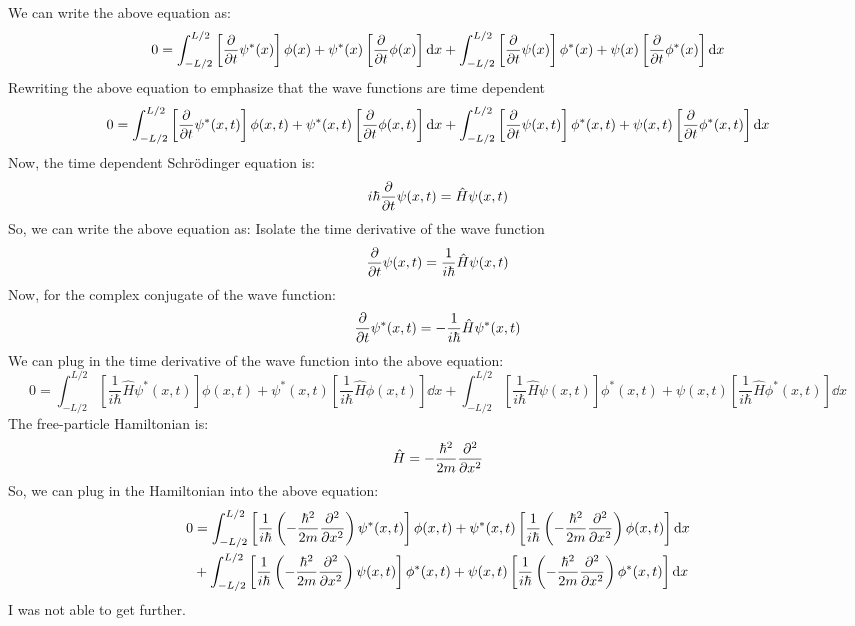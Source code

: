\documentclass[12pt]{article}
\begin{document}
We can write the above equation as:
\begin{equation}
  0=\int_{-L / 2}^{L / 2} \left[\pdv{t}\psi^*(x)\right]\phi(x)+\psi^*(x)\left[\pdv{t}\phi(x)\right]\dd{x}+\int_{-L / 2}^{L / 2} \left[\pdv{t}\psi(x)\right]\phi^*(x)+\psi(x)\left[\pdv{t}\phi^*(x)\right] \dd{x}
\end{equation}
Rewriting the above equation to emphasize that the wave functions are time dependent
\begin{equation}
  0=\int_{-L / 2}^{L / 2} \left[\pdv{t}\psi^*(x,t)\right]\phi(x,t)+\psi^*(x,t)\left[\pdv{t}\phi(x,t)\right]\dd{x}+\int_{-L / 2}^{L / 2} \left[\pdv{t}\psi(x,t)\right]\phi^*(x,t)+\psi(x,t)\left[\pdv{t}\phi^*(x,t)\right] \dd{x}
\end{equation}
Now, the time dependent Schrödinger equation is:
\begin{equation}
  i\hbar\pdv{t}\psi(x,t)=\hat{H}\psi(x,t)
\end{equation}
So, we can write the above equation as:
Isolate the time derivative of the wave function
\begin{equation}
  \pdv{t}\psi(x,t)=\frac{1}{i\hbar}\hat{H}\psi(x,t)
\end{equation}
Now, for the complex conjugate of the wave function:
\begin{equation}
  \pdv{t}\psi^*(x,t)=-\frac{1}{i\hbar}\hat{H}\psi^*(x,t)
\end{equation}
We can plug in the time derivative of the wave function into the above equation:
\begin{equation}
  0=\int_{-L / 2}^{L / 2} \left[\frac{1}{i\hbar}\hat{H}\psi^*(x,t)\right]\phi(x,t)+\psi^*(x,t)\left[\frac{1}{i\hbar}\hat{H}\phi(x,t)\right]\dd{x}+\int_{-L / 2}^{L / 2} \left[\frac{1}{i\hbar}\hat{H}\psi(x,t)\right]\phi^*(x,t)+\psi(x,t)\left[\frac{1}{i\hbar}\hat{H}\phi^*(x,t)\right] \dd{x}
\end{equation}
The free-particle Hamiltonian is:
\begin{equation}
  \hat{H}=-\frac{\hbar^2}{2m}\pdv[2]{x}
\end{equation}
So, we can plug in the Hamiltonian into the above equation:
\begin{equation}
  \begin{aligned}
    0&=\int_{-L / 2}^{L / 2} \left[\frac{1}{i\hbar}\left(-\frac{\hbar^2}{2m}\pdv[2]{x}\right)\psi^*(x,t)\right]\phi(x,t)+\psi^*(x,t)\left[\frac{1}{i\hbar}\left(-\frac{\hbar^2}{2m}\pdv[2]{x}\right)\phi(x,t)\right]\dd{x}\\
    &+\int_{-L / 2}^{L / 2} \left[\frac{1}{i\hbar}\left(-\frac{\hbar^2}{2m}\pdv[2]{x}\right)\psi(x,t)\right]\phi^*(x,t)+\psi(x,t)\left[\frac{1}{i\hbar}\left(-\frac{\hbar^2}{2m}\pdv[2]{x}\right)\phi^*(x,t)\right] \dd{x}\\
  \end{aligned}
\end{equation}
I was not able to get further.
\end{document}
